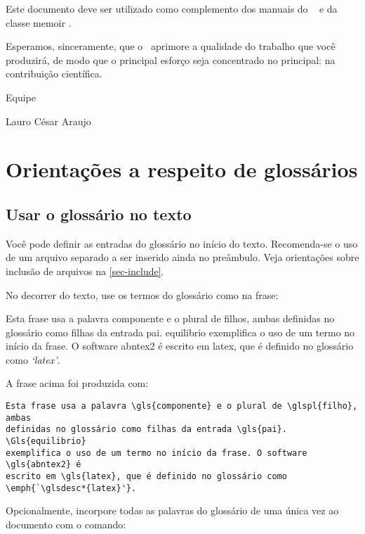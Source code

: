 \documentclass[
    12pt,				%
    openright,			%
    twoside,			%
    a4paper,			%
    english,			%
    french,				%
    spanish,			%
    brazil				%
    ]{abntex2}
\begin{document}
Este documento deve ser utilizado como complemento dos manuais do \abnTeX\ 
\cite{abntex2classe,abntex2cite,abntex2cite-alf} e da classe \textsf{memoir}
\cite{memoir}. 

Esperamos, sinceramente, que o \abnTeX\ aprimore a qualidade do trabalho que
você produzirá, de modo que o principal esforço seja concentrado no principal:
na contribuição científica.

Equipe \abnTeX 

Lauro César Araujo

\chapter{Orientações a respeito de glossários}
 
\section{Usar o glossário no texto}
 
Você pode definir as entradas do glossário no início do texto. Recomenda-se o
uso de um arquivo separado a ser inserido ainda no preâmbulo. Veja orientações
sobre inclusão de arquivos na \autoref{sec-include}.

No decorrer do texto, use os termos do glossário como na frase:

\begin{citacao}
Esta frase usa a palavra \gls{componente} e o plural de \glspl{filho}, ambas
definidas no glossário como filhas da entrada \gls{pai}. \Gls{equilibrio}
exemplifica o uso de um termo no início da frase. O software \gls{abntex2} é
escrito em \gls{latex}, que é definido no glossário como
\emph{`\glsdesc*{latex}'}.
\end{citacao}


A frase acima foi produzida com:

\begin{verbatim}
Esta frase usa a palavra \gls{componente} e o plural de \glspl{filho}, ambas
definidas no glossário como filhas da entrada \gls{pai}. \Gls{equilibrio}
exemplifica o uso de um termo no início da frase. O software \gls{abntex2} é
escrito em \gls{latex}, que é definido no glossário como
\emph{`\glsdesc*{latex}'}.
\end{verbatim}

Opcionalmente, incorpore todas as palavras do glossário de uma única vez ao
documento com o comando:
\end{document}
